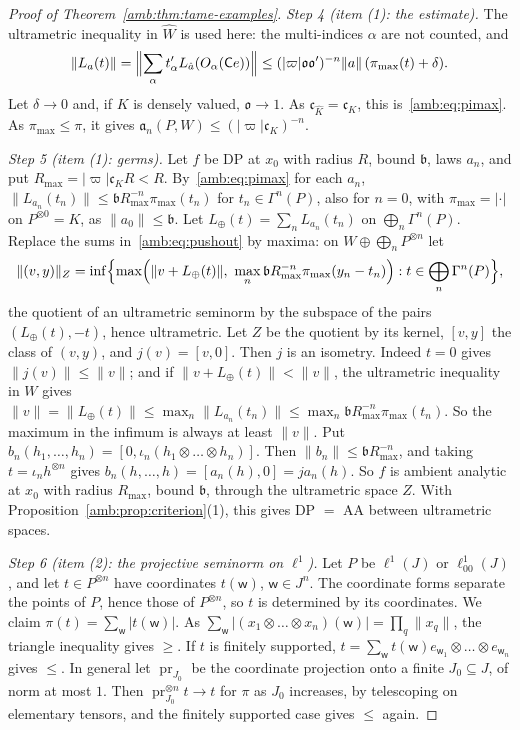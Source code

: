 \documentclass[11pt]{amsart}
\theoremstyle{definition}
\theoremstyle{remark}
\numberwithin{equation}{section}
\newcommand{\abs}[1]{\lvert #1\rvert}
\newcommand{\norm}[1]{\lVert #1\rVert}
\newcommand{\Kh}{\widehat K}
\theoremstyle{plain}
\theoremstyle{definition}
\theoremstyle{plain}
\begin{document}
\begin{proof}[Proof of Theorem~\ref{amb:thm:tame-examples}]
\emph{Step 4 (item (1): the estimate).} The ultrametric inequality in $\widehat W$ is used here: the multi-indices $\alpha$
are not counted, and
\[
 \norm{L_a(t)}=\Bigl\lVert\sum_\alpha t'_\alpha L_{\hat a}(O_\alpha(\mathsf Ce))\Bigr\rVert
 \le(\abs\varpi\mathfrak o\mathfrak o')^{-n}\norm a\,(\pi_{\max}(t)+\delta).
\]
Let $\delta\to0$ and, if $K$ is densely valued, $\mathfrak o\to1$. As $\mathfrak c_{\Kh}=\mathfrak c_K$, this
is~\eqref{amb:eq:pimax}. As $\pi_{\max}\le\pi$, it gives $\mathfrak a_n(P,W)\le(\abs\varpi\mathfrak c_K)^{-n}$.

\emph{Step 5 (item (1): germs).} Let $f$ be DP at $x_0$ with radius $R$, bound $\mathfrak b$, laws $a_n$, and put
$R_{\max}=\abs\varpi\mathfrak c_KR<R$. By~\eqref{amb:eq:pimax} for each $a_n$, $\norm{L_{a_n}(t_n)}\le \mathfrak bR_{\max}^{-n}\pi_{\max}(t_n)$ for $t_n\in\Gamma^n(P)$,
also for $n=0$, with $\pi_{\max}=\abs\cdot$ on $P^{\otimes0}=K$, as $\norm{a_0}\le \mathfrak b$. Let $L_\oplus(t)=\sum_nL_{a_n}(t_n)$ on $\bigoplus_n\Gamma^n(P)$. Replace the sums in~\eqref{amb:eq:pushout} by
maxima: on $W\oplus\bigoplus_nP^{\otimes n}$ let
\[
 \norm{(v,y)}_Z=\inf\Bigl\{\max\Bigl(\norm{v+L_\oplus(t)},\ \max_n\mathfrak bR_{\max}^{-n}\pi_{\max}(y_n-t_n)\Bigr):t\in\bigoplus_n\Gamma^n(P)\Bigr\},
\]
the quotient of an ultrametric seminorm by the subspace of the pairs $(L_\oplus(t),-t)$, hence ultrametric. Let $Z$ be the
quotient by its kernel, $[v,y]$ the class of $(v,y)$, and $j(v)=[v,0]$. Then $j$ is an isometry. Indeed $t=0$ gives
$\norm{j(v)}\le\norm v$; and if $\norm{v+L_\oplus(t)}<\norm v$, the ultrametric inequality in $W$ gives
$\norm v=\norm{L_\oplus(t)}\le\max_n\norm{L_{a_n}(t_n)}\le\max_n\mathfrak bR_{\max}^{-n}\pi_{\max}(t_n)$. So the maximum in the infimum is always
at least $\norm v$. Put
$b_n(h_1,\dots,h_n)=[0,\iota_n(h_1\otimes\dots\otimes h_n)]$. Then $\norm{b_n}\le \mathfrak bR_{\max}^{-n}$, and taking $t=\iota_nh^{\otimes n}$ gives
$b_n(h,\dots,h)=[a_n(h),0]=ja_n(h)$. So $f$ is ambient analytic at $x_0$ with radius $R_{\max}$, bound $\mathfrak b$,
through the ultrametric space $Z$. With Proposition~\ref{amb:prop:criterion}(1), this gives DP $=$ AA between ultrametric
spaces.

\emph{Step 6 (item (2): the projective seminorm on $\ell^1$).} Let $P$ be $\ell^1(J)$ or $\ell^1_{00}(J)$, and let $t\in P^{\otimes n}$ have
coordinates $t(\mathsf w)$, $\mathsf w\in J^n$. The coordinate forms separate the points of $P$, hence those of $P^{\otimes n}$, so $t$ is determined by its coordinates. We claim $\pi(t)=\sum_{\mathsf w}\abs{t(\mathsf w)}$. As
$\sum_{\mathsf w}\abs{(x_1\otimes\dots\otimes x_n)(\mathsf w)}=\prod_q\norm{x_q}$, the triangle inequality gives $\ge$. If $t$
is finitely supported, $t=\sum_{\mathsf w}t(\mathsf w)e_{\mathsf w_1}\otimes\dots\otimes e_{\mathsf w_n}$ gives $\le$. In
general let $\operatorname{pr}_{J_0}$ be the coordinate projection onto a finite $J_0\subseteq J$, of norm at most $1$. Then
$\operatorname{pr}_{J_0}^{\otimes n}t\to t$ for $\pi$ as $J_0$ increases, by telescoping on elementary tensors, and the
finitely supported case gives $\le$ again.


\end{proof}
\end{document}
